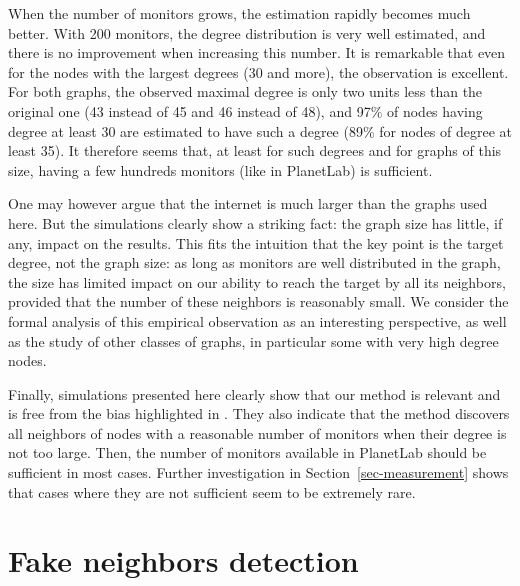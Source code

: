 \documentclass[conference]{IEEEtran}
\begin{document}
When the number of monitors grows, the estimation rapidly becomes much better. With 200 monitors, the degree distribution is very well estimated, and there is no improvement when increasing this number. It is remarkable that even for the nodes with the largest degrees (30 and more), the observation is excellent. For both graphs, the observed maximal degree is only two units less than the original one (43 instead of 45 and 46 instead of 48), and 97\% of nodes having degree at least 30 are estimated to have such a degree (89\% for nodes of degree at least 35).
It therefore seems that, at least for such degrees and for graphs of this size, having a few hundreds monitors (like in PlanetLab) is sufficient.

One may however argue that the internet is much larger than the graphs used
here. But the simulations clearly show a striking fact: the graph size has
little, if any, impact on the results. This fits the intuition that the key
point is the target degree, not the graph size: as long as monitors are well
distributed in the graph, the size has limited impact on our ability to reach
the target by all its neighbors, provided that the number of these neighbors is
reasonably small. We consider the formal analysis of this empirical observation
as an interesting perspective, as well as the study of other classes of graphs,
in particular some with very high degree nodes.

Finally, simulations presented here clearly show that our method is relevant and
is free from the bias highlighted in
\cite{DBLP:conf/infocom/LakhinaBCX03,DBLP:journals/jacm/AchlioptasCKM09}. They
also indicate that the method discovers all neighbors of nodes with a reasonable
number of monitors when their degree is not too large. Then, the number of
monitors available in PlanetLab should be sufficient in most cases. Further
investigation in Section~\ref{sec-measurement} shows that cases where they are
not sufficient seem to be extremely rare.

\vspace{-0.4em}

\section{Fake neighbors detection}\label{sec-fake}
\end{document}
